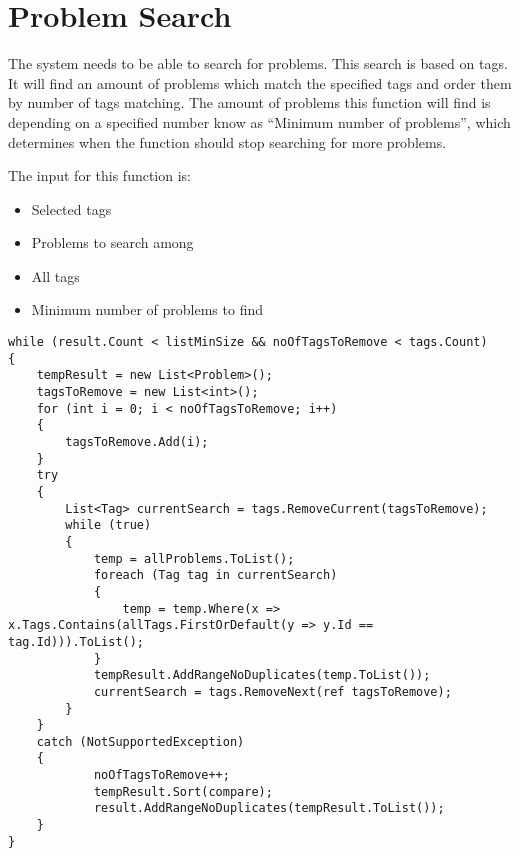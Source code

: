 \section{Problem Search}
The system needs to be able to search for problems.
This search is based on tags.
It will find an amount of problems which match the specified tags and order them by number of tags matching.
The amount of problems this function will find is depending on a specified number know as ``Minimum number of problems'', which determines when the function should stop searching for more problems.

The input for this function is:

\begin{itemize}
	\item Selected tags
	\item Problems to search among
	\item All tags
	\item Minimum number of problems to find
\end{itemize}



\begin{lstlisting}[style=sourceCode, caption=\myCaption{}, label=src:search]
while (result.Count < listMinSize && noOfTagsToRemove < tags.Count)
{
	tempResult = new List<Problem>();
	tagsToRemove = new List<int>();
	for (int i = 0; i < noOfTagsToRemove; i++)
	{
		tagsToRemove.Add(i);
	}
	try
	{
		List<Tag> currentSearch = tags.RemoveCurrent(tagsToRemove);
		while (true)
		{
			temp = allProblems.ToList();
			foreach (Tag tag in currentSearch)
			{
				temp = temp.Where(x => x.Tags.Contains(allTags.FirstOrDefault(y => y.Id == tag.Id))).ToList();
			}
			tempResult.AddRangeNoDuplicates(temp.ToList());
			currentSearch = tags.RemoveNext(ref tagsToRemove);
		}
	}
	catch (NotSupportedException)
	{
			noOfTagsToRemove++;
			tempResult.Sort(compare);
			result.AddRangeNoDuplicates(tempResult.ToList());
	}
}
\end{lstlisting}
